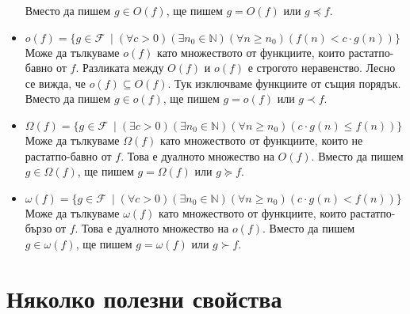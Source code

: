 \documentclass{article}
\newcommand{\N}{\mathbb{N}}
\newcommand{\F}{\mathcal{F}}
\theoremstyle{definition}
\theoremstyle{plain}
\theoremstyle{remark}
\theoremstyle{definition}
\begin{document}
\begin{itemize}
    Вместо да пишем $g \in O(f)$, ще пишем $g = O(f)$ или $g \preceq f$.
  \item $o(f) = \{ g \in \F \: \mid (\forall c > 0)(\exists n_0 \in \N)(\forall n \geq n_0)(f(n) < c \cdot g(n))\}$ \\
    Може да тълкуваме $o(f)$ като множеството от функциите, които растат\footnotemark[1] по-бавно от $f$.
    Разликата между $O(f)$ и $o(f)$ е строгото неравенство.
    Лесно се вижда, че $o(f) \subseteq O(f)$.
    Тук изключваме функциите от същия порядък.
    Вместо да пишем $g \in o(f)$, ще пишем $g = o(f)$ или $g \prec f$.
  \item $\Omega(f) = \{ g \in \F \: \mid (\exists c > 0)(\exists n_0 \in \N)(\forall n \geq n_0)(c \cdot g(n) \leq f(n))\}$ \\
    Може да тълкуваме $\Omega(f)$ като множеството от функциите, които не растат\footnotemark[1] по-бавно от $f$.
    Това е дуалното множество на $O(f)$.
    Вместо да пишем $g \in \Omega(f)$, ще пишем $g = \Omega(f)$ или $g \succeq f$.
  \item $\omega(f) = \{ g \in \F \: \mid (\forall c > 0)(\exists n_0 \in \N)(\forall n \geq n_0)(c \cdot g(n) < f(n))\}$ \\
    Може да тълкуваме $\omega(f)$ като множеството от функциите, които растат\footnotemark[1] по-бързо от $f$.
    Това е дуалното множество на $o(f)$.
    Вместо да пишем $g \in \omega(f)$, ще пишем $g = \omega(f)$ или $g \succ f$.
\end{itemize}

\section*{Няколко полезни свойства}
\end{document}
